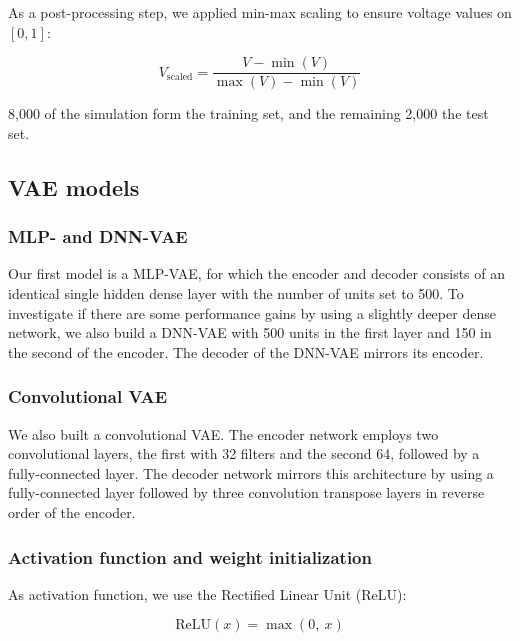 As a post-processing step, we applied min-max scaling to ensure voltage values on $[0, 1]$:

\begin{equation}
    V_\mathrm{scaled} = \frac{V - \min (V)}{\max(V) - \min(V)}
\end{equation}

8,000 of the simulation form the training set, and the remaining 2,000 the test set.

\subsection{VAE models}
\subsubsection{MLP- and DNN-VAE}

Our first model is a MLP-VAE, for which the encoder and decoder consists of an identical single hidden dense layer with the number of units set to 500. To investigate if there are some performance gains by using a slightly deeper dense network, we also build a DNN-VAE with 500 units in the first layer and 150 in the second of the encoder. The decoder of the DNN-VAE mirrors its encoder.

\subsubsection{Convolutional VAE}

We also built a convolutional VAE. The encoder network employs two convolutional layers, the first with 32 filters and the second 64, followed by a fully-connected layer. The decoder network mirrors this architecture by using a fully-connected layer followed by three convolution transpose layers in reverse order of the encoder.

\subsubsection*{Activation function and weight initialization}

As activation function, we use the Rectified Linear Unit (ReLU):

\begin{equation}
\mathrm{ReLU}(x) =\max( 0,\ x) 
\end{equation}

